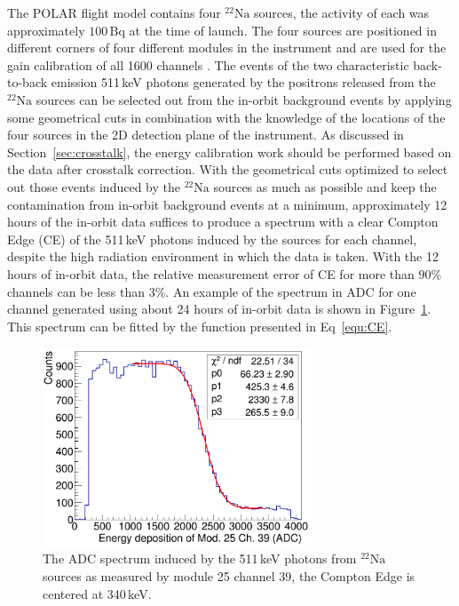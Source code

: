 \documentclass[preprint,sort&compress,12pt]{elsarticle}
\begin{document}
The POLAR flight model contains four $^{22}\mathrm{Na}$ sources, the activity of each was approximately $100\,\mathrm{Bq}$ at the time of launch. The four sources are positioned in different corners of four different modules in the instrument and are used for the gain calibration of all 1600 channels \cite{Xiao2017}. The events of the two characteristic back-to-back emission 511\,keV photons generated by the positrons released from the $^{22}\mathrm{Na}$ sources can be selected out from the in-orbit background events by applying some geometrical cuts in combination with the knowledge of the locations of the four sources in the 2D detection plane of the instrument. As discussed in Section~\ref{sec:crosstalk}, the energy calibration work should be performed based on the data after crosstalk correction. With the geometrical cuts optimized to select out those events induced by the $^{22}\mathrm{Na}$ sources as much as possible and keep the contamination from in-orbit background events at a minimum, approximately 12 hours of the in-orbit data suffices to produce a spectrum with a clear Compton Edge (CE) of the 511\,keV photons induced by the sources for each channel, despite the high radiation environment in which the data is taken. With the 12 hours of in-orbit data, the relative measurement error of CE for more than $90\%$ channels can be less than $3\%$. An example of the spectrum in ADC for one channel generated using about 24 hours of in-orbit data is shown in Figure~\ref{fig:CE}. This spectrum can be fitted by the function presented in Eq~\eqref{equ:CE}.

\begin{figure}[!ht]
\centering
\includegraphics[width=8cm]{images/compton_edge_25_39.png}
\hspace{1mm}
\caption{The ADC spectrum induced by the 511\,keV photons from $^{22}\mathrm{Na}$ sources as measured by module 25 channel 39, the Compton Edge is centered at 340\,keV.}\label{fig:CE}
\end{figure}
\end{document}
